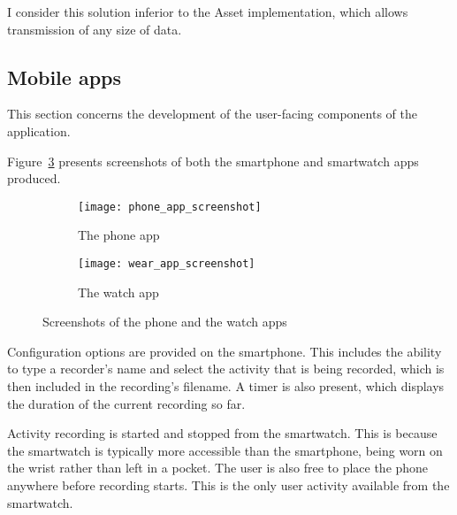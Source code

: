       I consider this solution inferior to the Asset implementation, which allows transmission of any size of data.
    \subsection{Mobile apps}
      This section concerns the development of the user-facing components of the application. 
      
      Figure~\ref{fig:app_screenshots} presents screenshots of both the smartphone and smartwatch apps produced.

      \begin{figure}[!th]
        \centering
        \begin{subfigure}[b]{0.3\textwidth}
                \texttt{[image: phone\_app\_screenshot]}
                \caption{The phone app}
                \label{fig:phone_app_screenshot}
        \end{subfigure}
        \qquad
        \begin{subfigure}[b]{0.3\textwidth}
                \texttt{[image: wear\_app\_screenshot]}
                \caption{The watch app}
                \label{fig:wear_app_screenshot}
        \end{subfigure}
        \caption{Screenshots of the phone and the watch apps}
        \label{fig:app_screenshots}
      \end{figure}
      
      Configuration options are provided on the smartphone. This includes the ability to type a recorder's name and select the activity that is being recorded, which is then included in the recording's filename. A timer is also present, which displays the duration of the current recording so far.
      
      Activity recording is started and stopped from the smartwatch. This is because the smartwatch is typically more accessible than the smartphone, being worn on the wrist rather than left in a pocket. The user is also free to place the phone anywhere before recording starts. This is the only user activity available from the smartwatch.
      
